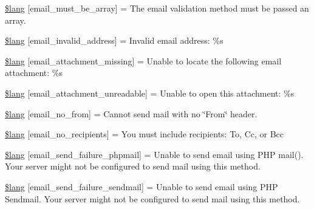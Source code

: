 \begin{DoxyCompactItemize}
\item 
\mbox{\hyperlink{email__lang_8php_acec7cb5b0da8dc5e98981525eff66d55}{\$lang}} \mbox{[}\textquotesingle{}email\+\_\+must\+\_\+be\+\_\+array\textquotesingle{}\mbox{]} = \textquotesingle{}The email validation method must be passed an array.\textquotesingle{}
\item 
\mbox{\hyperlink{email__lang_8php_af71f7471bf257dfa376cca1e4f0d45f7}{\$lang}} \mbox{[}\textquotesingle{}email\+\_\+invalid\+\_\+address\textquotesingle{}\mbox{]} = \textquotesingle{}Invalid email address\+: \%s\textquotesingle{}
\item 
\mbox{\hyperlink{email__lang_8php_a893b004d605cc0477011aa134b1062a1}{\$lang}} \mbox{[}\textquotesingle{}email\+\_\+attachment\+\_\+missing\textquotesingle{}\mbox{]} = \textquotesingle{}Unable to locate the following email attachment\+: \%s\textquotesingle{}
\item 
\mbox{\hyperlink{email__lang_8php_a47274d77980b4f1c7dd1a414f205bac6}{\$lang}} \mbox{[}\textquotesingle{}email\+\_\+attachment\+\_\+unreadable\textquotesingle{}\mbox{]} = \textquotesingle{}Unable to open this attachment\+: \%s\textquotesingle{}
\item 
\mbox{\hyperlink{email__lang_8php_aa2799a4268ac4f00370657fd57331861}{\$lang}} \mbox{[}\textquotesingle{}email\+\_\+no\+\_\+from\textquotesingle{}\mbox{]} = \textquotesingle{}Cannot send mail with no \char`\"{}From\char`\"{} header.\textquotesingle{}
\item 
\mbox{\hyperlink{email__lang_8php_a878f96e829f7f470e11cbb23db64aa10}{\$lang}} \mbox{[}\textquotesingle{}email\+\_\+no\+\_\+recipients\textquotesingle{}\mbox{]} = \textquotesingle{}You must include recipients\+: To, Cc, or Bcc\textquotesingle{}
\item 
\mbox{\hyperlink{email__lang_8php_a4abc09e5ddc7d7cebed337f301fd9602}{\$lang}} \mbox{[}\textquotesingle{}email\+\_\+send\+\_\+failure\+\_\+phpmail\textquotesingle{}\mbox{]} = \textquotesingle{}Unable to send email using P\+HP mail(). Your server might not be configured to send mail using this method.\textquotesingle{}
\item 
\mbox{\hyperlink{email__lang_8php_a8d4711ce5217c25c96d6368c22a96a27}{\$lang}} \mbox{[}\textquotesingle{}email\+\_\+send\+\_\+failure\+\_\+sendmail\textquotesingle{}\mbox{]} = \textquotesingle{}Unable to send email using P\+HP Sendmail. Your server might not be configured to send mail using this method.\textquotesingle{}
\item 

\end{DoxyCompactItemize}
